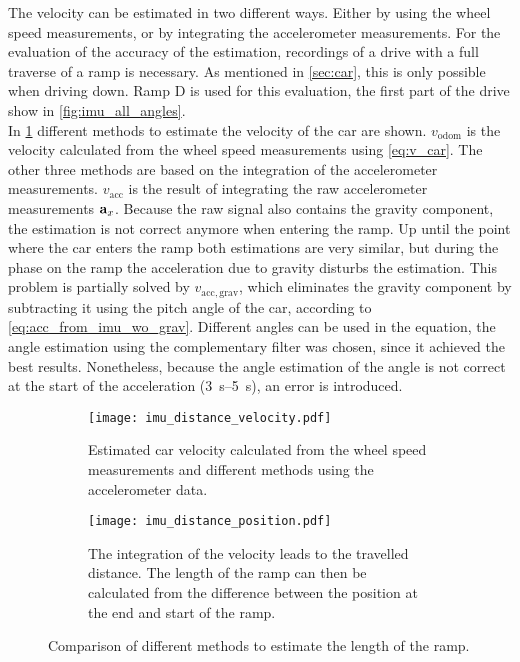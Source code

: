 The velocity can be estimated in two different ways.
Either by using the wheel speed measurements, or by integrating the accelerometer measurements.
For the evaluation of the accuracy of the estimation, recordings of a drive with a full traverse of a ramp is necessary.
As mentioned in \cref{sec:car}, this is only possible when driving down.
Ramp D is used for this evaluation, the first part of the drive show in \cref{fig:imu_all_angles}.\\
In \cref{fig:imu_distance_velocity} different methods to estimate the velocity of the car are shown.
$v_\mathrm{odom}$ is the velocity calculated from the wheel speed measurements using \cref{eq:v_car}.
The other three methods are based on the integration of the accelerometer measurements.
$v_\mathrm{acc}$ is the result of integrating the raw accelerometer measurements $\vb{a}_x$.
Because the raw signal also contains the gravity component, the estimation is not correct anymore when entering the ramp.
Up until the point where the car enters the ramp both estimations are very similar, but during the phase on the ramp the acceleration due to gravity disturbs the estimation.
This problem is partially solved by $v_\mathrm{acc, grav}$, which eliminates the gravity component by subtracting it using the pitch angle of the car, according to \cref{eq:acc_from_imu_wo_grav}.
Different angles can be used in the equation, the angle estimation using the complementary filter was chosen, since it achieved the best results.
Nonetheless, because the angle estimation of the angle is not correct at the start of the acceleration (\SIrange{3}{5}{\second}), an error is introduced.
\begin{figure}[htb]
	\centering
	\begin{subfigure}{1\textwidth}
		\centering
		\texttt{[image: imu\_distance\_velocity.pdf]}
		\caption[Car velocity estimation]{Estimated car velocity calculated from the wheel speed measurements and different methods using the accelerometer data.}
		\label{fig:imu_distance_velocity}
	\end{subfigure}
	
	\begin{subfigure}{1\textwidth}
		\centering
		\texttt{[image: imu\_distance\_position.pdf]}
		\caption[Car travelled distance estimation]{The integration of the velocity leads to the travelled distance. The length of the ramp can then be calculated from the difference between the position at the end and start of the ramp.}
		\label{fig:imu_distance_position}
	\end{subfigure}
	\caption{Comparison of different methods to estimate the length of the ramp.}
\end{figure}
